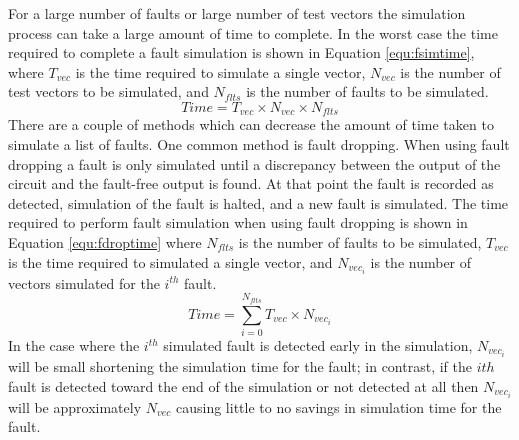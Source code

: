 \documentclass[12pt]{report}
\begin{document}
For a large number of faults or large number of test vectors the simulation process can take a large amount of time to complete. In the worst case the time required to complete a fault simulation is shown in Equation \ref{equ:fsimtime}, where $T_{vec}$ is the time required to simulate a single vector, $N_{vec}$ is the number of test vectors to be simulated, and $N_{flts}$ is the number of faults to be simulated.  
\begin{equation}
Time = T_{vec} \times N_{vec} \times N_{flts}
\label{equ:fsimtime}
\end{equation}
There are a couple of methods which can decrease the amount of time taken to simulate a list of faults.  One common method is fault dropping.  When using fault dropping a fault is only simulated until a discrepancy between the output of the circuit and the fault-free output is found.  At that point the fault is recorded as detected, simulation of the fault is halted, and a new fault is simulated\cite{stroud}.  The time required to perform fault simulation when using fault dropping is shown in Equation \ref{equ:fdroptime} where $N_{flts}$ is the number of faults to be simulated, $T_{vec}$ is the time required to simulated a single vector, and $N_{vec_i}$ is the number of vectors simulated for the $i^{th}$ fault.
\begin{equation}
Time =  \sum_{i=0}^{N_{flts}} T_{vec} \times N_{vec_i}
\label{equ:fdroptime}
\end{equation}
In the case where the $i^{th}$ simulated fault is detected early in the simulation, $N_{vec_i}$ will be small shortening the simulation time for the fault; in contrast, if the $ith$ fault is detected toward the end of the simulation or not detected at all then $N_{vec_i}$ will be approximately $N_{vec}$ causing little to no savings in simulation time for the fault\cite{stroud}.  
\end{document}
